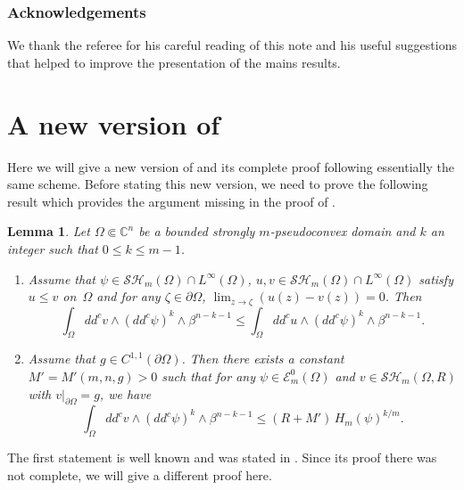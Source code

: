 \documentclass[JEP,XML,SOM,Unicode]{cedram}
\newtheorem{lemma}[theorem]{Lemma}
\theoremstyle{definition}
\newcommand{\C}{\mathbb{C}}
\begin{document}
\subsubsection*{Acknowledgements}
We thank the referee for his careful reading of this note and his useful suggestions that helped to improve the presentation of the mains results.

\section{A new version of \texorpdfstring{\cite[Lem.\,4.2]{BZ20}}{BZ20}}

Here we will give a new version of \cite[Lem.\,4.2]{BZ20} and its complete proof following essentially the same scheme. Before stating this new version, we need to prove the following result which provides the argument missing in the proof of \cite[Lem.\,4.2]{BZ20}.

\begin{lemma} \label{lem:claim2}
Let $\Omega \Subset \C^n$ be a bounded strongly $m$-pseudoconvex domain and $k$ an integer such that $0 \leq k \leq m-1$.
\begin{enumerate}
\item
Assume that $\psi \in \mathcal{SH}_m (\Omega) \cap L^{\infty} (\Omega)$, $u,v\in \mathcal{SH}_m(\Omega)\cap L^{\infty}(\Omega)$ satisfy $u \leq v$ on~$\Omega$ and for any $\zeta \in \partial \Omega$, $\lim_{z \rightarrow \zeta }(u(z)- v(z))= 0$.
Then
\begin{equation} \label{eq:claim1}
\int_{\Omega} dd^c v \wedge (dd^c \psi)^{k} \wedge\beta^{n-k-1} \leq \int_{\Omega} dd^c u \wedge (dd^c \psi)^k \wedge\beta^{n-k-1}.
\end{equation}

\item
Assume that $g \in C^{1,1} (\partial \Omega)$. Then there exists a constant $ M' = M'(m,n,g) > 0$ such that for any $\psi \in \mathcal{E}^0_m (\Omega)$ and $v \in \mathcal{SH}_m (\Omega,R)$ with $v|_{\partial \Omega} = g$, we have
\begin{equation} \label{eq:claim2}
\int_{\Omega} dd^c v \wedge(dd^c \psi)^k\wedge\beta^{n-k-1} \leq (R + M') \, H_m(\psi)^{k\slash m} .
\end{equation}
\end{enumerate}
\end{lemma}
The first statement is well known and was stated in \cite[Cor.\,2.9]{BZ20}. Since its proof there was not complete, we will give a different proof here.
\end{document}
